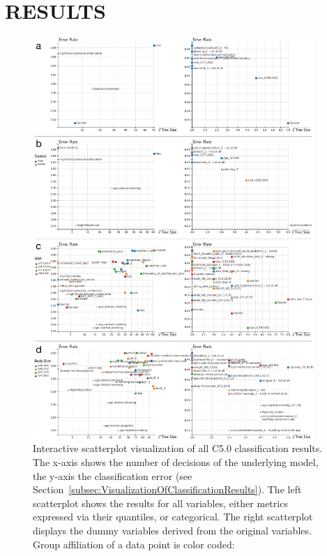 \documentclass[a4paper,twoside]{style/article}
\begin{document}
\section{\uppercase{Results}}
\begin{figure}[p!]
  \centering
  \includegraphics[width=0.95\textwidth]{figures/results}
  \caption{
Interactive scatterplot visualization of all C5.0 classification results.
The x-axis shows the number of decisions of the underlying model, the y-axis the classification error (see Section~\ref{subsec:VisualizationOfClassificationResults}).
The left scatterplot shows the results for all variables, either metrics expressed via their quantiles, or categorical.
The right scatterplot displays the dummy variables derived from the original variables.
Group affiliation of a data point is color coded:
}
\end{figure}
\end{document}

